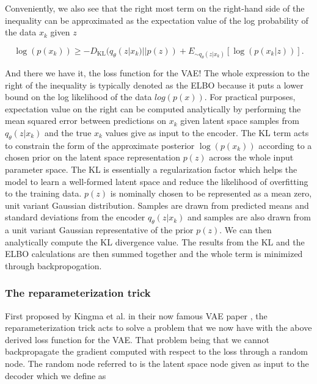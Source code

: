 Conveniently, we also see that the right most term on the 
right-hand side of the inequality can be approximated as the 
expectation value of the log probability of the data $x_k$ 
given $z$

\begin{equation}
    \log(p(x_k)) \geq - D_{\textrm{KL}}(q_{\theta}(z|x_k) || p(z)) + 
    E_{\sim q_{\theta}(z|x_k)}[ \log({p(x_k|z)})].\label{eq:vae_loss}
\end{equation}

And there we have it, the loss function for the \ac{VAE}! 
The whole expression to the right of the inequality
is typically denoted as the \ac{ELBO} because it puts a 
lower bound on the log likelihood of the data $log(p(x))$. For 
practical purposes, expectation value on the right can be computed analytically 
by performing the mean squared error between predictions on $x_k$ given 
latent space samples from $q_{\theta}(z|x_k)$ and the true 
$x_k$ values give as input to the encoder. The KL term acts to constrain 
the form of the approximate posterior $\log(p(x_k))$ according to 
a chosen prior on the latent space representation $p(z)$ across the whole input 
parameter space. The KL is essentially a regularization factor which helps 
the model to learn a well-formed latent space and reduce the likelihood 
of overfitting to the training data. $p(z)$ is nominally chosen to be 
represented as a mean zero, unit variant Gaussian distribution. Samples 
are drawn from predicted means and standard deviations from the 
encoder $q_{\theta}(z|x_k)$ and samples are also drawn from a unit variant 
Gaussian representative of the prior $p(z)$. We can then 
analytically compute the KL divergence value. The results from the KL 
and the ELBO calculations are then summed together and the whole term is 
minimized through backpropogation.

%
%
\subsubsection{The reparameterization trick}

First proposed by Kingma et al. in their now famous \ac{VAE} 
paper \cite{1312.6114}, the reparameterization trick acts to 
solve a problem that we now have with the above derived loss 
function for the \ac{VAE}. That problem being that we cannot 
backpropagate the gradient computed with respect to the loss through 
a random node. The random node referred to is the latent space node 
given as input to the decoder which we define as 

